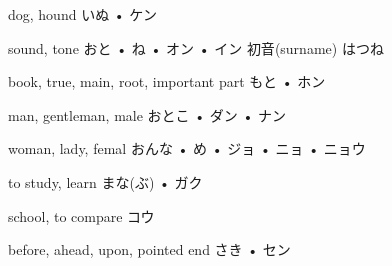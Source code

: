 



\setcounter{cardnum}{33}

		{dog, hound}
		{いぬ • ケン}
		{}{}
		{}{}
		{}{}
		{}{}
		{}{}

		{sound, tone}
		{おと • ね • オン • イン}
		{初音}{(surname) はつね}
		{}{}
		{}{}
		{}{}
		{}{}

		{book, true, main, root, important part}
		{もと • ホン}
		{}{}
		{}{}
		{}{}
		{}{}
		{}{}

		{man, gentleman, male}
		{おとこ • ダン • ナン}
		{}{}
		{}{}
		{}{}
		{}{}
		{}{}

		{woman, lady, femal}
		{おんな • め • ジョ • ニョ • ニョウ}
		{}{}
		{}{}
		{}{}
		{}{}
		{}{}

		{to study, learn}
		{まな(ぶ) • ガク}
		{}{}
		{}{}
		{}{}
		{}{}
		{}{}

		{school, to compare}
		{コウ}
		{}{}
		{}{}
		{}{}
		{}{}
		{}{}

		{before, ahead, upon, pointed end}
		{さき • セン}
		{}{}
		{}{}
		{}{}
		{}{}
		{}{}


